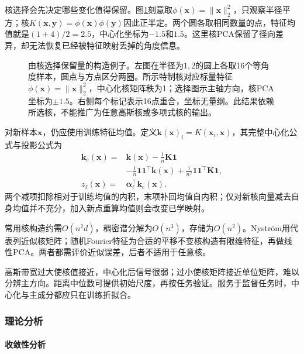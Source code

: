 核选择会先决定哪些变化值得保留。图\ref{fig:dim-kernel-radial}刻意取$\phi(\bm{x})=\lVert\bm{x}\rVert_2^2$，只观察半径平方；核$K(\bm{x},\bm{y})=\phi(\bm{x})\phi(\bm{y})$因此正半定。两个圆各取相同数量的点，特征均值就是$(1+4)/2=2.5$，中心化坐标为$-1.5$和$1.5$。这里核PCA保留了径向差异，却无法恢复已经被特征映射丢掉的角度信息。

\begin{figure}[htbp]
  \centering
  
  \caption{由核选择保留量的构造例子。左图在半径为$1,2$的圆上各取16个等角度样本，圆点与方点区分两圈。所示特制核对应标量特征$\phi(\bm{x})=\lVert\bm{x}\rVert_2^2$，中心化核矩阵秩为1；选择图示主轴方向，核PCA坐标为$\pm1.5$。右侧每个标记表示16点重合，坐标无量纲。此结果依赖所选核，不能推广为任意高斯核或多项式核的输出。}
  \label{fig:dim-kernel-radial}
\end{figure}

对新样本$\bm{x}$，仍应使用训练特征均值。定义$\bm{k}(\bm{x})_i=K(\bm{x}_i,\bm{x})$，其完整中心化公式与投影公式为
\begin{equation}
  \label{eq:dim-kpca-extension}
  \begin{aligned}
    \bm{k}_{\mathrm{c}}(\bm{x})
      ={}&\bm{k}(\bm{x})-\frac1n\bm{K}\bm{1}\\
         &-\frac1n\bm{1}\bm{1}^{\top}\bm{k}(\bm{x})
          +\frac1{n^2}\bm{1}\bm{1}^{\top}\bm{K}\bm{1},\\
    z_\ell(\bm{x})
      ={}&\bm{\alpha}_\ell^{\top}\bm{k}_{\mathrm{c}}(\bm{x}).
  \end{aligned}
\end{equation}
两个减项扣除相对于训练均值的内积，末项补回均值自内积；仅对新核向量减去自身均值并不充分，加入新点重算均值则会改变已学映射。

常用核构造约需$O(n^2d)$，稠密谱分解为$O(n^3)$，存储为$O(n^2)$。Nystr\"om用代表列近似核矩阵；随机Fourier特征为合适的平移不变核构造有限维特征，再做线性PCA。两者都需评价近似误差，后者不适用于任意核。

高斯带宽过大使核值接近，中心化后信号很弱；过小使核矩阵接近单位矩阵，难以分辨主方向。距离中位数可提供初始尺度，再按任务验证。服务于监督任务时，中心化与主成分都应只在训练折拟合。

\subsubsection{理论分析}
\label{sec:dim-kpca-theory}

\paragraph{收敛性分析}

